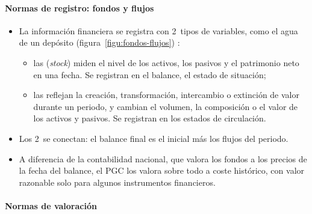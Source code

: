 \documentclass[11pt]{article}
\begin{document}
\paragraph{Normas de registro: fondos y flujos}

\begin{itemize}
\item La información financiera se registra con 2~tipos de variables, como el agua de un depósito (figura~\ref{figu:fondos-flujos}) :
  \begin{itemize}
  \item las  (\emph{stock}) miden el nivel de los activos, los pasivos y el patrimonio neto en una fecha. Se registran en el balance, el estado de situación;
  \item las  reflejan la creación, transformación, intercambio o extinción de valor durante un periodo, y cambian el volumen, la composición o el valor de los activos y pasivos. Se registran en los estados de circulación.
  \end{itemize}
\item Los 2~se conectan: el balance final es el inicial más los flujos del periodo.
\item A diferencia de la contabilidad nacional, que valora los fondos a los precios de la fecha del balance, el PGC los valora sobre todo a coste histórico, con valor razonable solo para algunos instrumentos financieros.
\end{itemize}

\begin{infografia}[H]
\centering
\caption{Fondos y flujos: el nivel y lo que entra y sale}\label{figu:fondos-flujos}
\end{infografia}

\paragraph{Normas de valoración}
\end{document}
